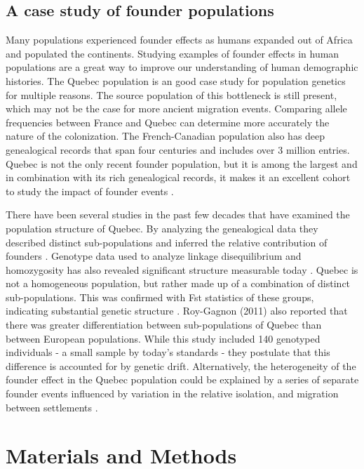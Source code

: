 \documentclass[
11pt, %
oneside, %
english, %
doublespacing, %
headsepline, %
chapterinoneline, %
]{MastersDoctoralThesis} %
\begin{document}
\subsection{A case study of founder populations}

Many populations experienced founder effects as humans expanded out of Africa and populated the continents.
Studying examples of founder effects in human populations are a great way to improve our understanding of human demographic histories.
The Quebec population is an good case study for population genetics for multiple reasons.
The source population of this bottleneck is still present, which may not be the case for more ancient migration events. 
Comparing allele frequencies between France and Quebec can determine more accurately the nature of the colonization.
The French-Canadian population also has deep genealogical records that span four centuries and includes over 3 million entries.
Quebec is not the only recent founder population, but it is among the largest and in combination with its rich genealogical records, it makes it an excellent cohort to study the impact of founder events \citep{Larmuseau2013,Bherer2010,Gagnon2011,Roy-Gagnon2011}.

There have been several studies in the past few decades that have examined the population structure of Quebec.
By analyzing the genealogical data they described distinct sub-populations and inferred the relative contribution of founders \citep{Gagnon2001, Bherer2010}.
Genotype data used to analyze linkage disequilibrium and homozygosity has also revealed significant structure measurable today \citep{ Roy-Gagnon2011}.
Quebec is not a homogeneous population, but rather made up of a combination of distinct sub-populations.
This was confirmed with Fst statistics of these groups, indicating substantial genetic structure \citep{Roy-Gagnon2011}.
Roy-Gagnon (2011) also reported that there was greater differentiation between sub-populations of Quebec than between European populations.
While this study included 140 genotyped individuals - a small sample by today's standards - they postulate that this difference is accounted for by genetic drift.
Alternatively, the heterogeneity of the founder effect in the Quebec population could be explained by a series of separate founder events influenced by variation in the relative isolation, and migration between settlements \citep{Gagnon2001,Laberge2005}.

\section{Materials and Methods}
\end{document}
